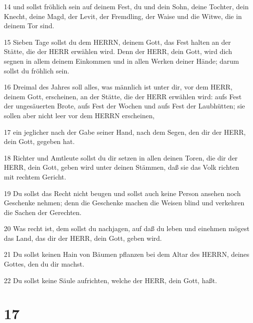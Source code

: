 \par 14 und sollst fröhlich sein auf deinem Fest, du und dein Sohn, deine Tochter, dein Knecht, deine Magd, der Levit, der Fremdling, der Waise und die Witwe, die in deinem Tor sind.
\par 15 Sieben Tage sollst du dem HERRN, deinem Gott, das Fest halten an der Stätte, die der HERR erwählen wird. Denn der HERR, dein Gott, wird dich segnen in allem deinem Einkommen und in allen Werken deiner Hände; darum sollst du fröhlich sein.
\par 16 Dreimal des Jahres soll alles, was männlich ist unter dir, vor dem HERR, deinem Gott, erscheinen, an der Stätte, die der HERR erwählen wird: aufs Fest der ungesäuerten Brote, aufs Fest der Wochen und aufs Fest der Laubhütten; sie sollen aber nicht leer vor dem HERRN erscheinen,
\par 17 ein jeglicher nach der Gabe seiner Hand, nach dem Segen, den dir der HERR, dein Gott, gegeben hat.
\par 18 Richter und Amtleute sollst du dir setzen in allen deinen Toren, die dir der HERR, dein Gott, geben wird unter deinen Stämmen, daß sie das Volk richten mit rechtem Gericht.
\par 19 Du sollst das Recht nicht beugen und sollst auch keine Person ansehen noch Geschenke nehmen; denn die Geschenke machen die Weisen blind und verkehren die Sachen der Gerechten.
\par 20 Was recht ist, dem sollst du nachjagen, auf daß du leben und einehmen mögest das Land, das dir der HERR, dein Gott, geben wird.
\par 21 Du sollst keinen Hain von Bäumen pflanzen bei dem Altar des HERRN, deines Gottes, den du dir machst.
\par 22 Du sollst keine Säule aufrichten, welche der HERR, dein Gott, haßt.

\chapter{17}

